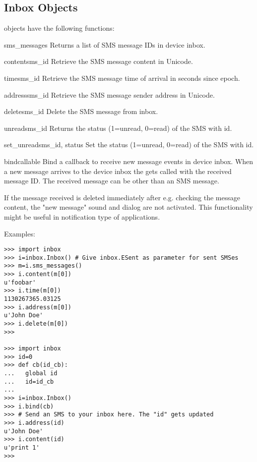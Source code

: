 \subsection{Inbox Objects}
\label{subsec:inbox}

 objects have the following functions:

\begin{methoddesc}[Inbox]{sms_messages}{}
Returns a list of SMS message IDs in device inbox.
\end{methoddesc}

\begin{methoddesc}[Inbox]{content}{sms_id}
Retrieve the SMS message content in Unicode. 
\end{methoddesc}

\begin{methoddesc}[Inbox]{time}{sms_id}
Retrieve the SMS message time of arrival in seconds since epoch. 
\end{methoddesc}

\begin{methoddesc}[Inbox]{address}{sms_id}
Retrieve the SMS message sender address in Unicode. 
\end{methoddesc}

\begin{methoddesc}[Inbox]{delete}{sms_id}
Delete the SMS message from inbox.
\end{methoddesc}

\begin{methoddesc}[Inbox]{unread}{sms_id}
Returns the status (1=unread, 0=read) of the SMS with id.
\end{methoddesc}

\begin{methoddesc}[inbox]{set_unread}{sms_id, status}
Set the status (1=unread, 0=read) of the SMS with id.
\end{methoddesc}

\begin{methoddesc}[Inbox]{bind}{callable}
Bind a callback to receive new message events in device inbox. When a new 
message arrives to the device inbox the  gets 
called with the received message ID. The received message can be other than 
an SMS message.

If the message received is deleted immediately after e.g. checking the message 
content, the "new message" sound and dialog are not activated. This 
functionality might be useful in notification type of applications. 
\end{methoddesc}

Examples:
\begin{verbatim}
>>> import inbox
>>> i=inbox.Inbox() # Give inbox.ESent as parameter for sent SMSes
>>> m=i.sms_messages()
>>> i.content(m[0])
u'foobar'
>>> i.time(m[0])
1130267365.03125
>>> i.address(m[0])
u'John Doe'
>>> i.delete(m[0])
>>>

>>> import inbox 
>>> id=0 
>>> def cb(id_cb):
...   global id 
...   id=id_cb
... 
>>> i=inbox.Inbox()
>>> i.bind(cb)
>>> # Send an SMS to your inbox here. The "id" gets updated
>>> i.address(id)
u'John Doe'
>>> i.content(id)
u'print 1'
>>>
\end{verbatim}
